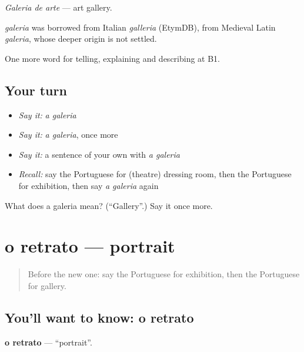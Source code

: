 \emph{Galeria de arte} — art gallery.

\begin{cousinweb}
\emph{galeria} was borrowed from Italian \emph{galleria} (EtymDB), from Medieval Latin \emph{galeria}, whose deeper origin is not settled.
\end{cousinweb}

\begin{grammarlens}[title={What you've built}]
One more word for telling, explaining and describing at B1.
\end{grammarlens}

\subsection*{Your turn}
\begin{itemize}
\raggedright
  \item \emph{Say it:} \emph{a galeria}
  \item \emph{Say it:} \emph{a galeria}, once more
  \item \emph{Say it:} a sentence of your own with \emph{a galeria}
  \item \emph{Recall:} say the Portuguese for (theatre) dressing room, then the Portuguese for exhibition, then say \emph{a galeria} again
\end{itemize}

\begin{tcolorbox}[breakable,colback=teal!4,colframe=teal!35!black,title={Before you move on}]
What does a galeria mean? (\textquotedblleft{}Gallery\textquotedblright{}.) Say it once more.
\end{tcolorbox}
\section[o retrato]{o retrato — portrait}

\label{lesson:PT-C522-retrato}



\begin{quote}
Before the new one: say the Portuguese for exhibition, then the Portuguese for gallery.
\end{quote}

\subsection*{You'll want to know: o retrato}
\textbf{o retrato} — \textquotedblleft{}portrait\textquotedblright{}.


